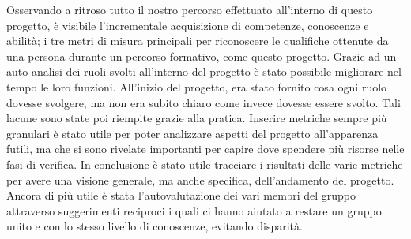 	\newline\newline
	Osservando a ritroso tutto il nostro percorso effettuato all’interno di questo progetto, è visibile l’incrementale acquisizione di competenze, conoscenze e abilità; i tre metri di misura principali per riconoscere le qualifiche ottenute da una persona durante un percorso formativo, come questo progetto.
	\newline
	Grazie ad un auto analisi dei ruoli svolti all’interno del progetto è stato possibile migliorare nel tempo le loro funzioni. All’inizio del progetto, era stato fornito cosa ogni ruolo dovesse svolgere, ma non era subito chiaro come invece dovesse essere svolto. Tali lacune sono state poi riempite grazie alla pratica.
	\newline
	Inserire metriche sempre più granulari è stato utile per poter analizzare aspetti del progetto all’apparenza futili, ma che si sono rivelate importanti per capire dove spendere più risorse nelle fasi di verifica.
	\newline
	In conclusione è stato utile tracciare i risultati delle varie metriche per avere una visione generale, ma anche specifica, dell’andamento del progetto. Ancora di più utile è stata l’autovalutazione dei vari membri del gruppo attraverso suggerimenti reciproci i quali ci hanno aiutato a restare un gruppo unito e con lo stesso livello di conoscenze, evitando disparità.
